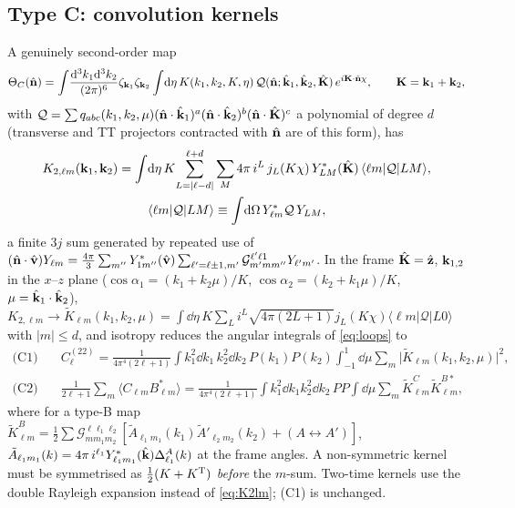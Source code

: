 \subsection{Type C: convolution kernels}
\label{sec:typeC}
A genuinely second-order map
\begin{equation}
\Theta_C(\hat{\mathbf n})=\int\!\frac{\mathrm d^3k_1\mathrm d^3k_2}{(2\pi)^6}\zeta_{\mathbf k_1}\zeta_{\mathbf k_2}\int\!\mathrm d\eta\,K(k_1,k_2,K,\eta)\,\mathcal Q(\hat{\mathbf n};\hat{\mathbf k}_1,\hat{\mathbf k}_2,\hat{\mathbf K})\,e^{i\mathbf K\cdot\hat{\mathbf n}\chi},
\qquad \mathbf K=\mathbf k_1+\mathbf k_2,
\label{eq:typeC}
\end{equation}
with $\mathcal Q=\sum q_{abc}(k_1,k_2,\mu)(\hat{\mathbf n}\cdot\hat{\mathbf k}_1)^a(\hat{\mathbf n}\cdot\hat{\mathbf k}_2)^b(\hat{\mathbf n}\cdot\hat{\mathbf K})^c$ a polynomial of degree $d$
(transverse and TT projectors contracted with $\hat{\mathbf n}$ are of this form), has
\begin{equation}
\begin{gathered}K_{2,\ell m}(\mathbf k_1,\mathbf k_2)=\int\!\mathrm d\eta\,K\!\sum_{L=|\ell-d|}^{\ell+d}\sum_M4\pi\,i^L\,j_L(K\chi)\,Y^*_{LM}(\hat{\mathbf K})\,\langle\ell m|\mathcal Q|LM\rangle,\\
\langle\ell m|\mathcal Q|LM\rangle\equiv\int\!\mathrm d\Omega\,Y^*_{\ell m}\mathcal Q\,Y_{LM},\end{gathered}
\label{eq:K2lm}
\end{equation}
a finite $3j$ sum generated by repeated use of $(\hat{\mathbf n}\cdot\hat{\mathbf v})Y_{\ell m}=\frac{4\pi}3\sum_{m''}Y^*_{1m''}(\hat{\mathbf v})\sum_{\ell'=\ell\pm1,m'}\mathcal G^{\ell'\ell1}_{m'mm''}Y_{\ell'm'}$.
In the frame $\hat{\mathbf K}=\hat{\mathbf z}$, $\mathbf k_{1,2}$ in the $x$--$z$ plane ($\cos\alpha_1=(k_1+k_2\mu)/K$, $\cos\alpha_2=(k_2+k_1\mu)/K$,
$\mu=\hat{\mathbf k}_1\cdot\hat{\mathbf k}_2$), $K_{2,\ell m}\to\tilde K_{\ell m}(k_1,k_2,\mu)=\int\dd\eta\,K\sum_L i^L\sqrt{4\pi(2L+1)}j_L(K\chi)\langle\ell m|\mathcal Q|L0\rangle$
with $|m|\le d$, and isotropy reduces the angular integrals of \eqref{eq:loops} to
\begin{align}
\text{(C1)}&\quad C^{(22)}_\ell=\frac1{4\pi^4(2\ell+1)}\int k_1^2\dd k_1\,k_2^2\dd k_2\,P(k_1)P(k_2)\int_{-1}^1\!\dd\mu\sum_m\big|\tilde K_{\ell m}(k_1,k_2,\mu)\big|^2,\nonumber\\
\text{(C2)}&\quad \frac1{2\ell+1}\sum_m\langle C_{\ell m}B^*_{\ell m}\rangle=\frac1{4\pi^4(2\ell+1)}\int k_1^2\dd k_1k_2^2\dd k_2\,PP\int\!\dd\mu\sum_m\tilde K^C_{\ell m}\tilde K^{B*}_{\ell m},
\label{eq:C1C2}
\end{align}
where for a type-B map $\tilde K^B_{\ell m}=\tfrac12\sum\mathcal G^{\ell\ell_1\ell_2}_{mm_1m_2}[\tilde A_{\ell_1m_1}(k_1)\tilde A'_{\ell_2m_2}(k_2)+(A\leftrightarrow A')]$,
$\tilde A_{\ell_1m_1}(k)=4\pi\,i^{\ell_1}Y^*_{\ell_1m_1}(\hat{\mathbf k})\Delta^A_{\ell_1}(k)$ at the frame angles.  A non-symmetric
kernel must be symmetrised as $\tfrac12(K+K^{\rm T})$ \emph{before} the $m$-sum.  Two-time kernels use the
double Rayleigh expansion instead of \eqref{eq:K2lm}; (C1) is unchanged.

